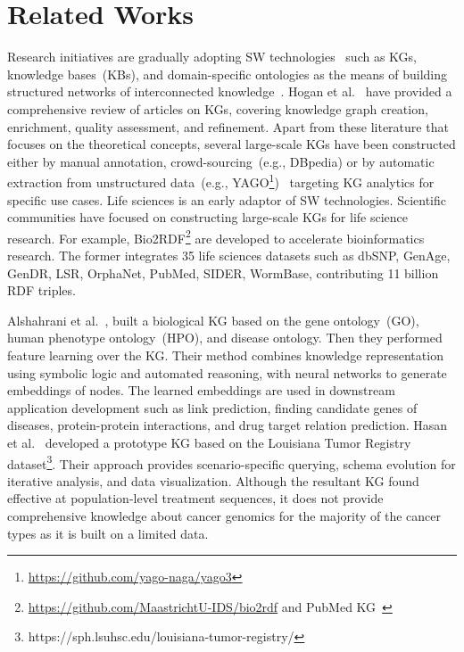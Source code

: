 \documentclass[10pt,journal,compsoc]{IEEEtran}
\begin{document}
\section{Related Works}\label{sec:rw}
\noindent Research initiatives are gradually adopting SW technologies~\cite{karim2018improving} such as KGs, knowledge bases~(KBs), and domain-specific ontologies as the means of building structured networks of interconnected knowledge~\cite{futia2020integration}. Hogan et al.~\cite{hogan2020knowledge} have provided a comprehensive review of articles on KGs, covering knowledge graph creation, enrichment, quality assessment, and refinement. Apart from these literature that focuses on the theoretical concepts, several large-scale KGs have been constructed either by manual annotation, crowd-sourcing~(e.g., DBpedia) or by automatic extraction from unstructured data~(e.g., YAGO\footnote{\url{https://github.com/yago-naga/yago3}})~\cite{wang2015explicit} targeting KG analytics for specific use cases. 
Life sciences is an early adaptor of SW technologies. Scientific communities have focused on constructing large-scale KGs for life science research. For example, Bio2RDF\footnote{\url{https://github.com/MaastrichtU-IDS/bio2rdf} and PubMed KG~\cite{xu2020building}} are developed to accelerate bioinformatics research. The former integrates 35 life sciences datasets such as dbSNP, GenAge, GenDR, LSR, OrphaNet, PubMed, SIDER, WormBase, contributing 11 billion RDF triples. 

Alshahrani et al.~\cite{alshahrani2017neuro}, built a biological KG based on the gene ontology~(GO), human phenotype ontology~(HPO), and disease ontology. Then they performed feature learning over the KG. Their method combines knowledge representation using symbolic logic and automated reasoning, with neural networks to generate embeddings of nodes. The learned embeddings are used in downstream application development such as link prediction, finding candidate genes of diseases, protein-protein interactions, and drug target relation prediction. Hasan et al.~\cite{hasan2020knowledge} developed a prototype KG based on the Louisiana Tumor Registry dataset\footnote{https://sph.lsuhsc.edu/louisiana-tumor-registry/}. Their approach provides scenario-specific querying, schema evolution for iterative analysis, and data visualization. Although the resultant KG found effective at population-level treatment sequences, it does not provide comprehensive knowledge about cancer genomics for the majority of the cancer types as it is built on a limited data.
\end{document}

